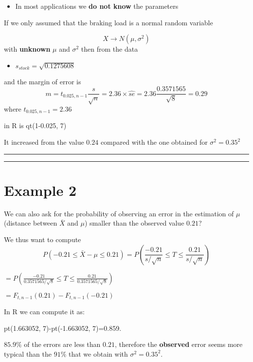 \documentclass[
]{book}
\providecommand{\tightlist}{%
  \setlength{\itemsep}{0pt}\setlength{\parskip}{0pt}}
\begin{document}
\begin{itemize}
\tightlist
\item
  In most applications we \textbf{do not know} the parameters
\end{itemize}

If we only assumed that the braking load is a normal random variable

\[X \rightarrow N(\mu, \sigma^2)\]
with \textbf{unknown} \(\mu\) and \(\sigma^2\) then from the data

\begin{itemize}
\tightlist
\item
  \(s_{stock}=\sqrt{0.1275608}\)
\end{itemize}

and the margin of error is \[m=t_{0.025, n-1} \frac{s}{\sqrt{n}}=2.36\times \hat{se}=2.36\frac{0.3571565}{\sqrt{8}}=0.29\]
where \(t_{0.025, n-1}=2.36\)

in R is qt(1-0.025, 7)

It increased from the value \(0.24\) compared with the one obtained for \(\sigma^2=0.35^2\)

\begin{center}\rule{0.5\linewidth}{0.5pt}\end{center}

\begin{center}\rule{0.5\linewidth}{0.5pt}\end{center}

\hypertarget{example-2-2}{%
\section{Example 2}\label{example-2-2}}

We can also ask for the probability of observing an error in the estimation of \(\mu\) (distance between \(\bar{X}\) and \(\mu\)) smaller than the observed value \(0.21\)?

We thus want to compute \[P(-0.21 \leq \bar{X} - \mu\leq 0.21)=P(\frac{-0.21}{s/\sqrt{n}} \leq T \leq \frac{0.21}{s/\sqrt{n}})\]

\(=P(\frac{-0.21}{0.3571565/\sqrt{8}} \leq T \leq \frac{0.21}{0.3571565/\sqrt{8}})\)

\(=F_{t, n-1}(0.21)-F_{t, n-1}(-0.21)\)

In R we can compute it as:

pt(1.663052, 7)-pt(-1.663052, 7)=0.859.

\(85.9\%\) of the errors are less than \(0.21\), therefore the \textbf{observed} error seems more typical than the \(91\%\) that we obtain with \(\sigma^2=0.35^2\).
\end{document}
